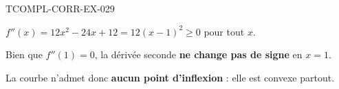 \begin{corrige}{TCOMPL-CORR-EX-029}

$f''(x) = 12x^2 - 24x + 12 = 12(x-1)^2 \geq 0$ pour tout $x$.


Bien que $f''(1) = 0$, la dérivée seconde \textbf{ne change pas de signe} en $x=1$.

La courbe n'admet donc \textbf{aucun point d'inflexion} : elle est convexe partout.

\end{corrige}
